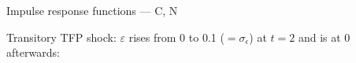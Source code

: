 \documentclass{beamer}
\begin{document}
\begin{frame}{Impulse response functions --- C, N}

  Transitory TFP shock: $\varepsilon$ rises from 0 to 0.1 ($=\sigma_\epsilon$) at $t=2$ and is at 0 afterwards:
\begin{center}
\vspace{-5mm}
\begin{figure}[h!]
\end{figure}
\end{center}

\end{frame}
\end{document}
